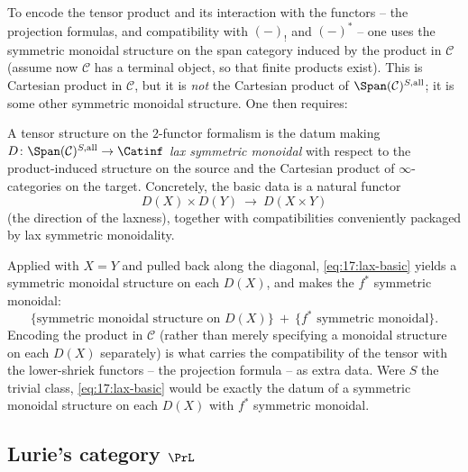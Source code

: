 To encode the tensor product and its interaction with the functors -- the projection
formulas, and compatibility with $(-)_{!}$ and $(-)^{*}$ -- one uses the symmetric monoidal
structure on the span category induced by the product in $\mathcal C$ (assume now
$\mathcal C$ has a terminal object, so that finite products exist). This is Cartesian
product in $\mathcal C$, but it is \emph{not} the Cartesian product of
$\Span(\mathcal C)^{S,\mathrm{all}}$; it is some other symmetric monoidal structure. One
then requires:

\begin{definition}
\label{def:17:lax}
A tensor structure on the $2$-functor formalism is the datum making
$D\colon\Span(\mathcal C)^{S,\mathrm{all}}\to\Catinf$ \emph{lax symmetric monoidal} with
respect to the product-induced structure on the source and the Cartesian product of
$\infty$-categories on the target. Concretely, the basic data is a natural functor
\begin{equation}
\label{eq:17:lax-basic}
D(X)\times D(Y)\ \longrightarrow\ D(X\times Y)
\end{equation}
(the direction of the laxness), together with compatibilities conveniently packaged by lax
symmetric monoidality.
\end{definition}

\begin{remark}
\label{rmk:17:unwind-lax}
Applied with $X=Y$ and pulled back along the diagonal, \eqref{eq:17:lax-basic} yields a
symmetric monoidal structure on each $D(X)$, and makes the $f^{*}$ symmetric monoidal:
\begin{equation*}
\bigl\{\text{symmetric monoidal structure on }D(X)\bigr\}\ +\ \bigl\{f^{*}\text{ symmetric monoidal}\bigr\}.
\end{equation*}
Encoding the product in $\mathcal C$ (rather than merely specifying a monoidal structure on
each $D(X)$ separately) is what carries the compatibility of the tensor with the
lower-shriek functors -- the projection formula -- as extra data. Were $S$ the trivial
class, \eqref{eq:17:lax-basic} would be exactly the datum of a symmetric monoidal structure
on each $D(X)$ with $f^{*}$ symmetric monoidal.
\end{remark}

\subsection{Lurie's category \texorpdfstring{$\PrL$}{PrL}}
\label{subsec:17:PrL}

